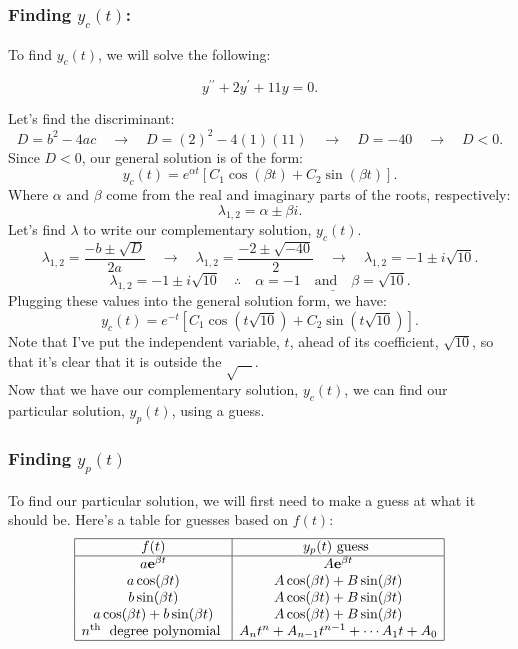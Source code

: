 \documentclass[a4paper,12pt]{article}
\begin{document}
\subsubsection*{Finding $y_c(t)$:}
To find $y_c(t)$, we will solve the following:

$$ y^{\prime \prime}+2 y^{\prime}+11 y = 0 .$$

Let's find the discriminant:
$$ D = b^2 - 4ac\quad\rightarrow \quad D =  (2)^2 - 4(1)(11) \quad\rightarrow \quad D = -40 \quad\rightarrow\quad D<0.$$
Since $D<0$, our general solution is of the form:
$$ y_c(t) = e^{\alpha t}\left[C_1\cos(\beta t) + C_2\sin(\beta t)\right]. $$
Where $\alpha$ and $\beta$ come from the real and imaginary parts of the roots, respectively:
$$ \lambda_{1,2} = \alpha \pm \beta i. $$
Let's find $\lambda$ to write our complementary solution, $y_c(t)$.
$$ \lambda_{1,2} = \frac{-b \pm \sqrt{D}}{2a} \quad\rightarrow \quad \lambda_{1,2} = \frac{-2 \pm \sqrt{-40}}{2} \quad\rightarrow \quad \lambda_{1,2} = -1 \pm i\sqrt{10}. $$
$$ \lambda_{1,2} = -1 \pm i\sqrt{10} \quad\therefore\quad \underline{\alpha = -1 \quad\text{and}\quad \beta=\sqrt{10}.} $$
Plugging these values into the general solution form, we have:
$$\boxed{ y_c(t) = e^{-t}\left[C_1\cos{\left(t\sqrt{10}\right)} + C_2\sin{\left(t\sqrt{10}\right)}\right]. }$$
Note that I've put the independent variable, $t$, ahead of its coefficient, $\sqrt{10}$, so that it's clear that it is outside the $\sqrt{\quad}$.\\

Now that we have our complementary solution, $y_c(t)$, we can find our particular solution, $y_p(t)$, using a guess.
\subsubsection*{Finding $y_p(t)$}
To find our particular solution, we will first need to make a guess at what it should be. Here's a table for guesses based on $f(t)$:
$$ \begin{array}{|c|c|}
\hline f(t) & y_p(t) \text { guess } \\
\hline a \mathbf{e}^{\beta t} & A \mathbf{e}^{\beta t} \\
a \cos (\beta t) & A \cos (\beta t)+B \sin (\beta t) \\
b \sin (\beta t) & A \cos (\beta t)+B \sin (\beta t) \\
a \cos (\beta t)+b \sin (\beta t) & A \cos (\beta t)+B \sin (\beta t) \\
n^{\text {th }} \text { degree polynomial } & A_n t^n+A_{n-1} t^{n-1}+\cdots A_1 t+A_0 \\
\hline
\end{array} $$
\end{document}
